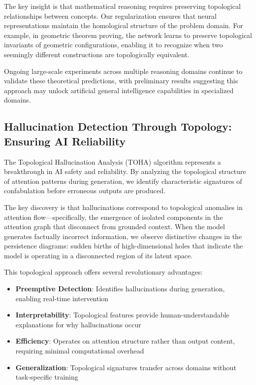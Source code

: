 \documentclass[11pt]{article}
\begin{document}
The key insight is that mathematical reasoning requires preserving topological relationships between concepts. Our regularization ensures that neural representations maintain the homological structure of the problem domain. For example, in geometric theorem proving, the network learns to preserve topological invariants of geometric configurations, enabling it to recognize when two seemingly different constructions are topologically equivalent.

Ongoing large-scale experiments across multiple reasoning domains continue to validate these theoretical predictions, with preliminary results suggesting this approach may unlock artificial general intelligence capabilities in specialized domains.

\subsection{Hallucination Detection Through Topology: Ensuring AI Reliability}

The Topological Hallucination Analysis (TOHA) algorithm represents a breakthrough in AI safety and reliability. By analyzing the topological structure of attention patterns during generation, we identify characteristic signatures of confabulation before erroneous outputs are produced.

The key discovery is that hallucinations correspond to topological anomalies in attention flow—specifically, the emergence of isolated components in the attention graph that disconnect from grounded context. When the model generates factually incorrect information, we observe distinctive changes in the persistence diagrams: sudden births of high-dimensional holes that indicate the model is operating in a disconnected region of its latent space.

This topological approach offers several revolutionary advantages:
\begin{itemize}
\item \textbf{Preemptive Detection}: Identifies hallucinations during generation, enabling real-time intervention
\item \textbf{Interpretability}: Topological features provide human-understandable explanations for why hallucinations occur
\item \textbf{Efficiency}: Operates on attention structure rather than output content, requiring minimal computational overhead
\item \textbf{Generalization}: Topological signatures transfer across domains without task-specific training
\end{itemize}
\end{document}
